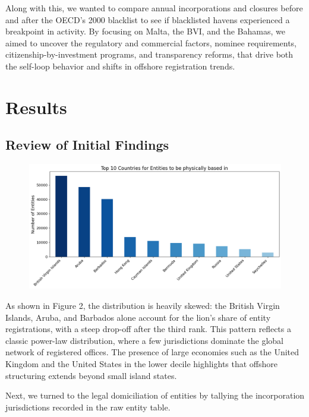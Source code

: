 \documentclass{article}
\begin{document}
Along with this, we wanted to compare annual incorporations and closures before and after the OECD’s 2000 blacklist to see if blacklisted havens experienced a breakpoint in activity. By focusing on Malta, the BVI, and the Bahamas, we aimed to uncover the regulatory and commercial factors, nominee requirements, citizenship-by-investment programs, and transparency reforms, that drive both the self-loop behavior and shifts in offshore registration trends.

\section{Results}
\subsection{Review of Initial Findings}

\begin{figure}[H]
  \centering
    \caption{} 
  \label{fig:fig2}
  \includegraphics[width=\textwidth]{Figure 2.png}
\end{figure}

As shown in Figure 2, the distribution is heavily skewed: the British Virgin Islands, Aruba, and Barbados alone account for the lion’s share of entity registrations, with a steep drop-off after the third rank. This pattern reflects a classic power-law distribution, where a few jurisdictions dominate the global network of registered offices. The presence of large economies such as the United Kingdom and the United States in the lower decile highlights that offshore structuring extends beyond small island states.

Next, we turned to the legal domiciliation of entities by tallying the incorporation jurisdictions recorded in the raw entity table.
\end{document}
